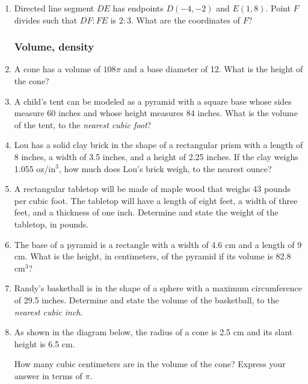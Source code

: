 \documentclass[12pt, oneside]{article}
\begin{document}
\begin{enumerate}[itemsep=0cm]
\item Directed line segment $DE$ has endpoints $D(-4, -2)$ and $E(1,8)$.
Point $F$ divides such that $DF:FE$ is $2:3$. What are the coordinates
of $F$?

\newpage
\subsubsection*{Volume, density}
\item A cone has a volume of $108\pi$ and a base diameter of 12. What is the
height of the cone?

\item A child's tent can be modeled as a pyramid with a square base whose sides measure 60 inches and whose height measures 84 inches. What
is the volume of the tent, to the \emph{nearest cubic foot}?

\item Lou has a solid clay brick in the shape of a rectangular prism with a length of 8 inches, a width of 3.5 inches, and a height of 2.25 inches. If the clay weighs 1.055 oz/in$^3$, how much does Lou's brick weigh, to the nearest ounce? 

\item A rectangular tabletop will be made of maple wood that weighs 43 pounds per cubic foot. The tabletop will have a length of eight feet, a width of three feet, and a thickness of one inch. Determine and state the weight of the tabletop, in pounds.

\item The base of a pyramid is a rectangle with a width of 4.6 cm and a
length of 9 cm. What is the height, in centimeters, of the pyramid if
its volume is 82.8 cm$^3$?

\item Randy's basketball is in the shape of a sphere with a maximum circumference of 29.5 inches. Determine and state the volume of the basketball, to the \emph{nearest cubic inch}.

\item As shown in the diagram below, the radius of a cone is 2.5 cm and its slant height is 6.5 cm.
  \begin{center}
  \end{center}
How many cubic centimeters are in the volume of the cone? Express your answer in terms of $\pi$.



\end{enumerate}
\end{document}
